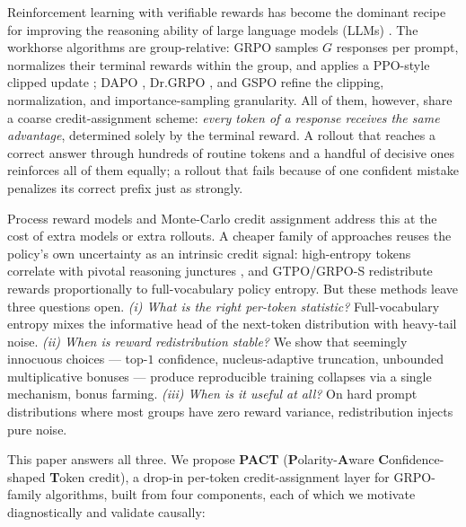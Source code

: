 \documentclass{article} %
\theoremstyle{plain}
\theoremstyle{definition}
\theoremstyle{remark}
\newcommand{\method}{PACT}
\begin{document}
Reinforcement learning with verifiable rewards has become the dominant recipe for improving the reasoning ability of large language models (LLMs) \citep{guo2025deepseek,jaech2024openai}. The workhorse algorithms are group-relative: GRPO \citep{shao2024deepseekmath} samples $G$ responses per prompt, normalizes their terminal rewards within the group, and applies a PPO-style clipped update \citep{schulman2017ppo}; DAPO \citep{yu2025dapo}, Dr.GRPO \citep{liu2025drgrpo}, and GSPO \citep{zheng2025gspo} refine the clipping, normalization, and importance-sampling granularity. All of them, however, share a coarse credit-assignment scheme: \emph{every token of a response receives the same advantage}, determined solely by the terminal reward. A rollout that reaches a correct answer through hundreds of routine tokens and a handful of decisive ones reinforces all of them equally; a rollout that fails because of one confident mistake penalizes its correct prefix just as strongly.

Process reward models \citep{lightman2023let,uesato2022solving} and Monte-Carlo credit assignment \citep{kazemnejad2024vineppo} address this at the cost of extra models or extra rollouts. A cheaper family of approaches reuses the policy's own uncertainty as an intrinsic credit signal: high-entropy tokens correlate with pivotal reasoning junctures \citep{wang2025beyond,cui2025entropy}, and GTPO/GRPO-S \citep{tan2025gtpo} redistribute rewards proportionally to full-vocabulary policy entropy. But these methods leave three questions open. \emph{(i) What is the right per-token statistic?} Full-vocabulary entropy mixes the informative head of the next-token distribution with heavy-tail noise. \emph{(ii) When is reward redistribution stable?} We show that seemingly innocuous choices --- top-$1$ confidence, nucleus-adaptive truncation, unbounded multiplicative bonuses --- produce reproducible training collapses via a single mechanism, bonus farming. \emph{(iii) When is it useful at all?} On hard prompt distributions where most groups have zero reward variance, redistribution injects pure noise.

This paper answers all three. We propose \textbf{\method{}} (\textbf{P}olarity-\textbf{A}ware \textbf{C}onfidence-shaped \textbf{T}oken credit), a drop-in per-token credit-assignment layer for GRPO-family algorithms, built from four components, each of which we motivate diagnostically and validate causally:
\end{document}
